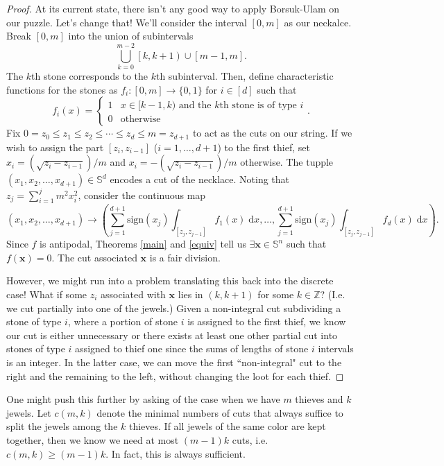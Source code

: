 \documentclass[12pt]{amsart}
\theoremstyle{definition}
\begin{document}
    \begin{proof}
        At its current state, there isn't any good way to apply Borsuk-Ulam on our puzzle. Let's change that! We'll consider the interval $[0,m]$ as our neckalce. Break $[0,m]$ into the union of subintervals $$\bigcup_{k=0}^{m-2} \left[k, k+1\right) \cup \left[m-1, m\right].$$ The $k$th stone corresponds to the $k$th subinterval. Then, define characteristic functions for the stones as $f_i:[0,m] \to \{0,1\}$ for $i \in [d]$ such that $$f_i(x) = \begin{cases} 1 & x \in [k-1, k) \text{ and the $k$th stone is of type $i$}\\ 0 & \text{otherwise} \end{cases}.$$ Fix $0 = z_0 \leq z_1 \leq z_2 \leq \cdots \leq z_d \leq m= z_{d+1}$ to act as the cuts on our string. If we wish to assign the part $[z_i,z_{i-1}]$ ($i = 1, \ldots, d+1$) to the first thief, set $x_i = \left(\sqrt{z_{i} - z_{i-1}}\right)/m$ and $x_i = -\left(\sqrt{z_i - z_{i-1}}\right)/m$ otherwise. The tupple $(x_1,x_2,\ldots,x_{d+1}) \in \mathbb S^d$ encodes a cut of the necklace. Noting that $z_j = \sum_{i=1}^{j} m^2x_i^2$, consider the continuous map $$(x_1,x_2,\ldots,x_{d+1}) \to \left(\sum_{j=1}^{d+1} \mathrm{sign}(x_j) \int_{[z_j,z_{j-1}]} f_1(x) \; \mathrm{d}x , \ldots, \sum_{j=1}^{d+1} \mathrm{sign}(x_j) \int_{[z_j,z_{j-1}]} f_d(x) \; \mathrm{d}x\right).$$ Since $f$ is antipodal, Theorems \ref{main} and \ref{equiv} tell us $\exists \mathbf x \in \mathbb S^n$ such that $f(\mathbf x) = 0$. The cut associated $\mathbf x$ is a fair division. 

        However, we might run into a problem translating this back into the discrete case! What if some $z_i$ associated with $\mathbf x$ lies in $\left(k, k+1\right)$ for some $k \in \mathbb Z$? (I.e. we cut partially into one of the jewels.) Given a non-integral cut subdividing a stone of type $i$, where a portion of stone $i$ is assigned to the first thief, we know our cut is either unnecessary or there exists at least one other partial cut into stones of type $i$ assigned to thief one since the sums of lengths of stone $i$ intervals is an integer. In the latter case, we can move the first ``non-integral" cut to the right and the remaining to the left, without changing the loot for each thief.
    \end{proof}
    
    One might push this further by asking of the case when we have $m$ thieves and $k$ jewels. Let $c(m,k)$ denote the minimal numbers of cuts that always suffice to split the jewels among the $k$ thieves. If all jewels of the same color are kept together, then we know we need at most $(m-1)k$ cuts, i.e. $c(m,k) \geq (m-1)k$. In fact, this is always sufficient.
\end{document}
